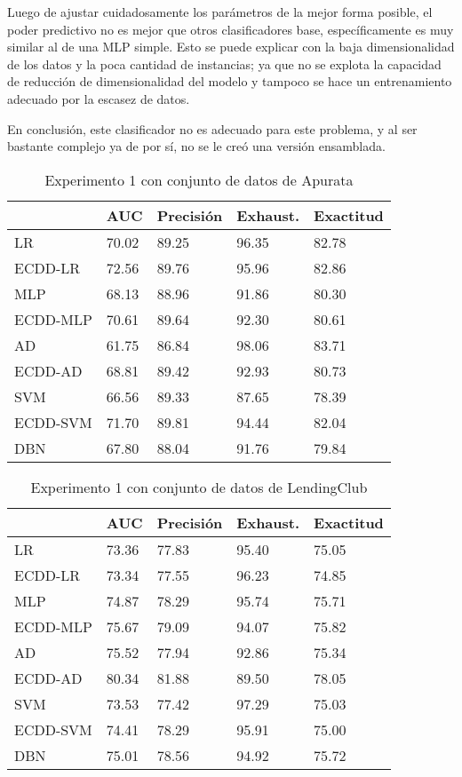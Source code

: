 Luego de ajustar cuidadosamente los parámetros de la mejor forma posible, el poder predictivo no es mejor que otros clasificadores base, específicamente es muy similar al de una \ac{MLP} simple. Esto se puede explicar con la baja dimensionalidad de los datos y la poca cantidad de instancias; ya que no se explota la capacidad de reducción de dimensionalidad del modelo y tampoco se hace un entrenamiento adecuado por la escasez de datos.

En conclusión, este clasificador no es adecuado para este problema, y al ser bastante complejo ya de por sí, no se le creó una versión ensamblada.


\begin{table}[]
\centering
\caption{Experimento 1 con conjunto de datos de Apurata}
\label{tab:apurata-proc1}
\begin{tabularx}{0.75\textwidth}{|l|Y Y Y Y|}
				\hline
				& AUC		& Precisión	& Exhaust.		& Exactitud	\\
				\hline
LR				& 70.02		& 89.25		& 96.35			& 82.78		\\
ECDD-LR			& 72.56		& 89.76		& 95.96			& 82.86		\\
				\hline
MLP				& 68.13		& 88.96		& 91.86			& 80.30		\\
ECDD-MLP		& 70.61		& 89.64		& 92.30			& 80.61		\\
				\hline
AD				& 61.75		& 86.84		& 98.06			& 83.71		\\
ECDD-AD			& 68.81		& 89.42		& 92.93			& 80.73		\\
				\hline
SVM				& 66.56		& 89.33		& 87.65			& 78.39		\\
ECDD-SVM		& 71.70		& 89.81		& 94.44			& 82.04		\\
				\hline
DBN				& 67.80		& 88.04		& 91.76			& 79.84		\\
				\hline
\end{tabularx}
\end{table}


\begin{table}[]
\centering
\caption{Experimento 1 con conjunto de datos de LendingClub}
\label{tab:lc-proc1}
\begin{tabularx}{0.75\textwidth}{|l|Y Y Y Y|}
				\hline
				& AUC		& Precisión	& Exhaust.		& Exactitud	\\
				\hline
LR				& 73.36		& 77.83		& 95.40			& 75.05		\\
ECDD-LR			& 73.34		& 77.55		& 96.23			& 74.85		\\
				\hline
MLP				& 74.87		& 78.29		& 95.74			& 75.71		\\
ECDD-MLP		& 75.67		& 79.09		& 94.07			& 75.82		\\
				\hline
AD				& 75.52		& 77.94		& 92.86			& 75.34		\\
ECDD-AD			& 80.34		& 81.88		& 89.50			& 78.05		\\
				\hline
SVM				& 73.53		& 77.42		& 97.29			& 75.03		\\
ECDD-SVM		& 74.41		& 78.29		& 95.91			& 75.00		\\
				\hline
DBN				& 75.01		& 78.56		& 94.92			& 75.72		\\
				\hline
\end{tabularx}
\end{table}


